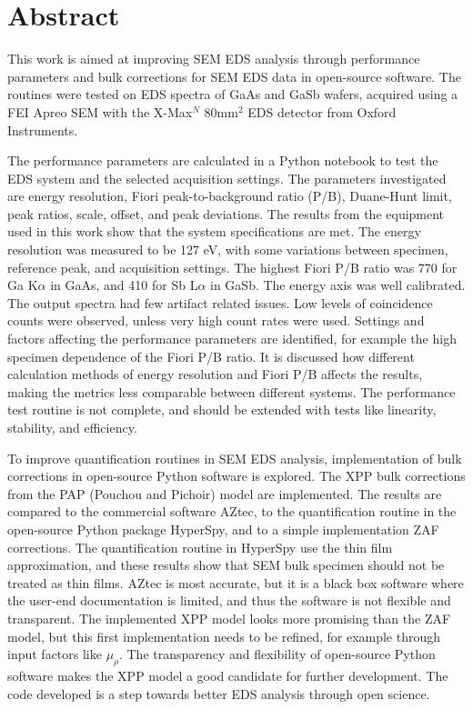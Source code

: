 \chapter*{Abstract}

\label{ch:abstract}

This work is aimed at improving SEM EDS analysis through performance parameters and bulk corrections for SEM EDS data in open-source software.
The routines were tested on EDS spectra of GaAs and GaSb wafers, acquired using a FEI Apreo SEM with the X-Max$^N$ 80mm$^2$ EDS detector from Oxford Instruments.

The performance parameters are calculated in a Python notebook to test the EDS system and the selected acquisition settings.
The parameters investigated are energy resolution, Fiori peak-to-background ratio (P/B), Duane-Hunt limit, peak ratios, scale, offset, and peak deviations.
The results from the equipment used in this work show that the system specifications are met.
The energy resolution was measured to be 127 eV, with some variations between specimen, reference peak, and acquisition settings.
The highest Fiori P/B ratio was 770 for Ga K$\alpha$ in GaAs, and 410 for Sb L$\alpha$ in GaSb.
The energy axis was well calibrated.
The output spectra had few artifact related issues. 
Low levels of coincidence counts were observed, unless very high count rates were used.
Settings and factors affecting the performance parameters are identified, for example the high specimen dependence of the Fiori P/B ratio.
It is discussed how different calculation methods of energy resolution and Fiori P/B affects the results, making the metrics less comparable between different systems.
The performance test routine is not complete, and should be extended with tests like linearity, stability, and efficiency.


To improve quantification routines in SEM EDS analysis, implementation of bulk corrections in open-source Python software is explored.
The XPP bulk corrections from the PAP (Pouchou and Pichoir) model are implemented.
The results are compared to the commercial software AZtec, to the quantification routine in the open-source Python package HyperSpy, and to a simple implementation ZAF corrections.
The quantification routine in HyperSpy use the thin film approximation, and these results show that SEM bulk specimen should not be treated as thin films.
AZtec is most accurate, but it is a black box software where the user-end documentation is limited, and thus the software is not flexible and transparent.
The implemented XPP model looks more promising than the ZAF model, but this first implementation needs to be refined, for example through input factors like $\mu_\rho$.
The transparency and flexibility of open-source Python software makes the XPP model a good candidate for further development.
The code developed is a step towards better EDS analysis through open science.



